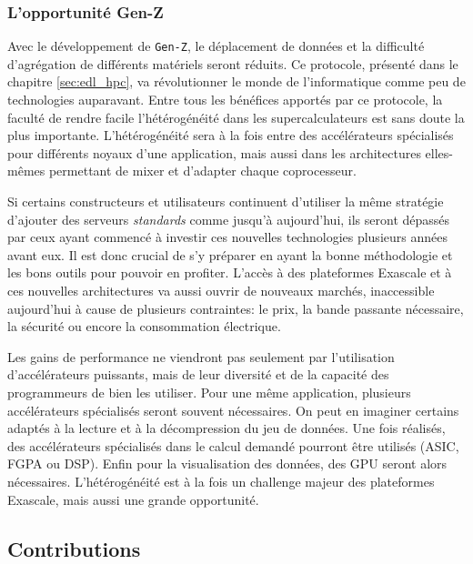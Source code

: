     
    \subsubsection{L'opportunité Gen-Z}
       
        Avec le développement de \verb=Gen-Z=, le déplacement de données et la difficulté d'agrégation de différents matériels seront réduits. Ce protocole, présenté dans le chapitre \ref{sec:edl_hpc}, va révolutionner le monde de l'informatique comme peu de technologies auparavant. Entre tous les bénéfices apportés par ce protocole, la faculté de rendre facile l'hétérogénéité dans les supercalculateurs est sans doute la plus importante. L'hétérogénéité sera à la fois entre des accélérateurs spécialisés pour différents noyaux d'une application, mais aussi dans les architectures elles-mêmes permettant de mixer et d'adapter chaque coprocesseur. 
        
        Si certains constructeurs et utilisateurs continuent d'utiliser la même stratégie d'ajouter des serveurs \textit{standards} comme jusqu'à aujourd'hui, ils seront dépassés par ceux ayant commencé à investir ces nouvelles technologies plusieurs années avant eux. Il est donc crucial de s'y préparer en ayant la bonne méthodologie et les bons outils pour pouvoir en profiter. L'accès à des plateformes Exascale et à ces nouvelles architectures va aussi ouvrir de nouveaux marchés, inaccessible aujourd'hui à cause de plusieurs contraintes: le prix, la bande passante nécessaire, la sécurité ou encore la consommation électrique. 
        
        Les gains de performance ne viendront pas seulement par l'utilisation d'accélérateurs puissants, mais de leur diversité et de la capacité des programmeurs de bien les utiliser. Pour une même application, plusieurs accélérateurs spécialisés seront souvent nécessaires. On peut en imaginer certains adaptés à la lecture et à la décompression du jeu de données. Une fois réalisés, des accélérateurs spécialisés dans le calcul demandé pourront être utilisés (ASIC, FGPA ou DSP). Enfin pour la visualisation des données, des GPU seront alors nécessaires. L'hétérogénéité est à la fois un challenge majeur des plateformes Exascale, mais aussi une grande opportunité. 
        
    
\subsection{Contributions}

